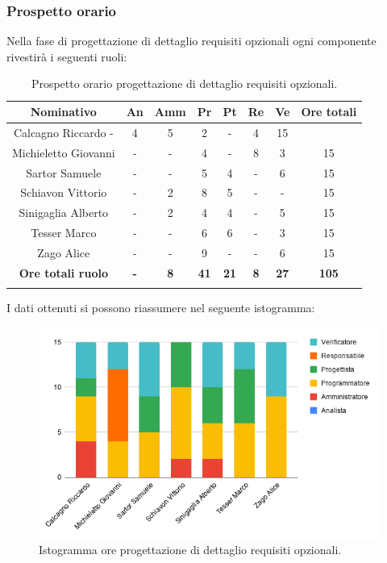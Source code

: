 \subsubsection{Prospetto orario}

Nella fase di progettazione di dettaglio requisiti opzionali ogni componente rivestirà i seguenti ruoli:
\begin{longtable}{|c|c|c|c|c|c|c|c|}
	\hline
	\rowcolor[HTML]{F9CB9C} 
	\textbf{Nominativo} & \textbf{An} & \textbf{Amm} & \textbf{Pr} & \textbf{Pt} & \textbf{Re} & \textbf{Ve} & \textbf{Ore totali} \\
	\hline
	Calcagno Riccardo
	- &
	4 &
	5 &
	2 &
	- &
	4 &
	15 \\
	\hline
	Michieletto Giovanni &
	- &
	- &
	4 &
	- &
	8 &
	3 &
	15 \\
	\hline
	Sartor Samuele & 
	- &
	- &
	5 &
	4 &
	- &
	6 &
	15 \\
	\hline
	Schiavon Vittorio & 
	- &
	2 &
	8 &
	5 &
	- &
	- &
	15 \\
	\hline
	Sinigaglia Alberto & 
	- &
	2 &
	4 &
	4 &
	- &
	5 &
	15 \\
	\hline
	Tesser Marco &
	- &
	- &
	6 &
	6 &
	- &
	3 &
	15 \\
	\hline
	Zago Alice &
	- &
	- &
	9 &
	- &
	- &
	6 &
	15 \\
	\hline	
	\rowcolor[HTML]{F9CB9C} 
	\textbf{Ore totali ruolo} & \textbf{-} & \textbf{8} & \textbf{41} & \textbf{21} & \textbf{8} & \textbf{27} & \textbf{105} \\
	\hline
	\caption{Prospetto orario progettazione di dettaglio requisiti opzionali.}
	\label{fig: Prospetto orario progettazione di dettaglio requisiti opzionali.}
\end{longtable}

I dati ottenuti si possono riassumere nel seguente istogramma:
\begin{figure}[H]
	\centering
	\includegraphics[width=0.8\linewidth]{./res/images/OreOpzionali.png}
	\caption{Istogramma ore progettazione di dettaglio requisiti opzionali.}
	\label{fig: Istogramma ore progettazione di dettaglio requisiti opzionali.}
\end{figure}

